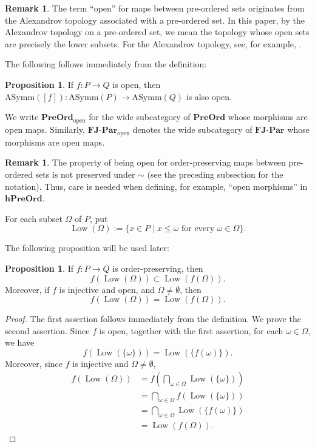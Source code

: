 \documentclass[12pt, a4paper]{amsart}
\theoremstyle{definition}
\newtheorem{proposition}[theorem]{Proposition}
\newtheorem{remark}[theorem]{Remark}
\newcommand{\Low}{\mathop{\mathrm{Low}}\nolimits}
\newcommand{\open}{\mathop{\mathrm{open}}\nolimits}
\newcommand{\AS}{\mathrm{ASymm}}
\newcommand{\PreOrd}{\mathbf{PreOrd}}
\newcommand{\hPreOrd}{\mathbf{hPreOrd}}
\newcommand{\FinJoinParOrd}{\mathbf{FJ}\text{-}\mathbf{Par}}
\begin{document}
\begin{remark}
The term ``open'' for maps between pre-ordered sets originates from the Alexandrov topology associated with a pre-ordered set. In this paper, by the Alexandrov topology on a pre-ordered set, we mean the topology whose open sets are precisely the lower subsets. For the Alexandrov topology, see, for example, \cite{Johnstone1986stonespaces}.
\end{remark}

The following follows immediately from the definition:

\begin{proposition}
If $f : P \rightarrow Q$ is open, then $\AS([f]) : \AS(P) \rightarrow \AS(Q)$ is also open.
\end{proposition}

We write $\PreOrd_{\open}$ for the wide subcategory of $\PreOrd$ whose morphisms are open maps. Similarly, $\FinJoinParOrd_{\open}$ denotes the wide subcategory of $\FinJoinParOrd$ whose morphisms are open maps.

\begin{remark}
The property of being open for order-preserving maps between pre-ordered sets is not preserved under $\sim$ (see the preceding subsection for the notation). Thus, care is needed when defining, for example, ``open morphisms'' in $\hPreOrd$.
\end{remark}

For each subset $\Omega$ of $P$, put
\[
\Low(\Omega) := \{ x \in P \mid x \leq \omega \text{ for every } \omega \in \Omega \}.
\]

The following proposition will be used later:

\begin{proposition}\label{proposition:LowOmega}
If $f : P \rightarrow Q$ is order-preserving, then
\[
f(\Low(\Omega)) \subset \Low(f(\Omega)).
\]
Moreover, if $f$ is injective and open, and $\Omega \neq \emptyset$, then
\[
f(\Low(\Omega)) = \Low(f(\Omega)).
\]
\end{proposition}

\begin{proof}
The first assertion follows immediately from the definition. We prove the second assertion. Since $f$ is open, together with the first assertion, for each $\omega \in \Omega$, we have
\[
f(\Low(\{ \omega \})) = \Low(\{ f(\omega) \}).
\]
Moreover, since $f$ is injective and $\Omega \neq \emptyset$,
\begin{align*}
f(\Low(\Omega))
    &= f\left(\bigcap_{\omega \in \Omega} \Low(\{ \omega \})\right) \\
    &= \bigcap_{\omega \in \Omega} f(\Low(\{ \omega \})) \\
    &= \bigcap_{\omega \in \Omega} \Low(\{ f(\omega) \}) \\
    &= \Low(f(\Omega)).
\end{align*}
\end{proof}
\end{document}
